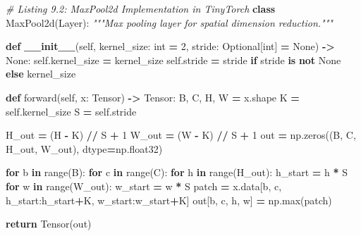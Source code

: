 \documentclass[
  letterpaper,
]{scrbook}
\newenvironment{Shaded}{\begin{snugshade}}{\end{snugshade}}
\newcommand{\BuiltInTok}[1]{#1}
\newcommand{\CommentTok}[1]{\textcolor[rgb]{0.56,0.35,0.01}{\textit{#1}}}
\newcommand{\ControlFlowTok}[1]{\textcolor[rgb]{0.13,0.29,0.53}{\textbf{#1}}}
\newcommand{\DecValTok}[1]{\textcolor[rgb]{0.00,0.00,0.81}{#1}}
\newcommand{\FunctionTok}[1]{\textcolor[rgb]{0.13,0.29,0.53}{\textbf{#1}}}
\newcommand{\KeywordTok}[1]{\textcolor[rgb]{0.13,0.29,0.53}{\textbf{#1}}}
\newcommand{\NormalTok}[1]{#1}
\newcommand{\OperatorTok}[1]{\textcolor[rgb]{0.81,0.36,0.00}{\textbf{#1}}}
\newcommand{\VariableTok}[1]{\textcolor[rgb]{0.00,0.00,0.00}{#1}}
\begin{document}
\begin{Shaded}
\begin{Highlighting}[]
\CommentTok{\# Listing 9.2: MaxPool2d Implementation in TinyTorch}
\KeywordTok{class}\NormalTok{ MaxPool2d(Layer):}
    \CommentTok{"""Max pooling layer for spatial dimension reduction."""}

    \KeywordTok{def} \FunctionTok{\_\_init\_\_}\NormalTok{(}\VariableTok{self}\NormalTok{, kernel\_size: }\BuiltInTok{int} \OperatorTok{=} \DecValTok{2}\NormalTok{, stride: Optional[}\BuiltInTok{int}\NormalTok{] }\OperatorTok{=} \VariableTok{None}\NormalTok{) }\OperatorTok{{-}\textgreater{}} \VariableTok{None}\NormalTok{:}
        \VariableTok{self}\NormalTok{.kernel\_size }\OperatorTok{=}\NormalTok{ kernel\_size}
        \VariableTok{self}\NormalTok{.stride }\OperatorTok{=}\NormalTok{ stride }\ControlFlowTok{if}\NormalTok{ stride }\KeywordTok{is} \KeywordTok{not} \VariableTok{None} \ControlFlowTok{else}\NormalTok{ kernel\_size}

    \KeywordTok{def}\NormalTok{ forward(}\VariableTok{self}\NormalTok{, x: Tensor) }\OperatorTok{{-}\textgreater{}}\NormalTok{ Tensor:}
\NormalTok{        B, C, H, W }\OperatorTok{=}\NormalTok{ x.shape}
\NormalTok{        K }\OperatorTok{=} \VariableTok{self}\NormalTok{.kernel\_size}
\NormalTok{        S }\OperatorTok{=} \VariableTok{self}\NormalTok{.stride}

\NormalTok{        H\_out }\OperatorTok{=}\NormalTok{ (H }\OperatorTok{{-}}\NormalTok{ K) }\OperatorTok{//}\NormalTok{ S }\OperatorTok{+} \DecValTok{1}
\NormalTok{        W\_out }\OperatorTok{=}\NormalTok{ (W }\OperatorTok{{-}}\NormalTok{ K) }\OperatorTok{//}\NormalTok{ S }\OperatorTok{+} \DecValTok{1}
\NormalTok{        out }\OperatorTok{=}\NormalTok{ np.zeros((B, C, H\_out, W\_out), dtype}\OperatorTok{=}\NormalTok{np.float32)}

        \ControlFlowTok{for}\NormalTok{ b }\KeywordTok{in} \BuiltInTok{range}\NormalTok{(B):}
            \ControlFlowTok{for}\NormalTok{ c }\KeywordTok{in} \BuiltInTok{range}\NormalTok{(C):}
                \ControlFlowTok{for}\NormalTok{ h }\KeywordTok{in} \BuiltInTok{range}\NormalTok{(H\_out):}
\NormalTok{                    h\_start }\OperatorTok{=}\NormalTok{ h }\OperatorTok{*}\NormalTok{ S}
                    \ControlFlowTok{for}\NormalTok{ w }\KeywordTok{in} \BuiltInTok{range}\NormalTok{(W\_out):}
\NormalTok{                        w\_start }\OperatorTok{=}\NormalTok{ w }\OperatorTok{*}\NormalTok{ S}
\NormalTok{                        patch }\OperatorTok{=}\NormalTok{ x.data[b, c, h\_start:h\_start}\OperatorTok{+}\NormalTok{K, w\_start:w\_start}\OperatorTok{+}\NormalTok{K]}
\NormalTok{                        out[b, c, h, w] }\OperatorTok{=}\NormalTok{ np.}\BuiltInTok{max}\NormalTok{(patch)}

        \ControlFlowTok{return}\NormalTok{ Tensor(out)}
\end{Highlighting}
\end{Shaded}
\end{document}
